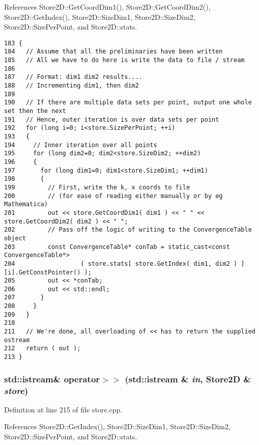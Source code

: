 References Store2D::GetCoordDim1(), Store2D::GetCoordDim2(), Store2D::GetIndex(), Store2D::SizeDim1, Store2D::SizeDim2, Store2D::SizePerPoint, and Store2D::stats.

\begin{Code}\begin{verbatim}183 {
184   // Assume that all the preliminaries have been written
185   // All we have to do here is write the data to file / stream
186 
187   // Format: dim1 dim2 results....
188   // Incrementing dim1, then dim2
189   
190   // If there are multiple data sets per point, output one whole set then the next
191   // Hence, outer iteration is over data sets per point
192   for (long i=0; i<store.SizePerPoint; ++i)
193   {
194     // Inner iteration over all points
195     for (long dim2=0; dim2<store.SizeDim2; ++dim2)
196     {
197       for (long dim1=0; dim1<store.SizeDim1; ++dim1)
198       {
199         // First, write the k, x coords to file
200         // (for ease of reading either manually or by eg Mathematica)
201         out << store.GetCoordDim1( dim1 ) << " " << store.GetCoordDim2( dim2 ) << " ";
202         // Pass off the logic of writing to the ConvergenceTable object
203         const ConvergenceTable* conTab = static_cast<const ConvergenceTable*>
204                  ( store.stats[ store.GetIndex( dim1, dim2 ) ][i].GetConstPointer() );
205         out << *conTab;
206         out << std::endl;
207       }
208     }
209   }
210 
211   // We're done, all overloading of << has to return the supplied ostream
212   return ( out );
213 }
\end{verbatim}
\end{Code}


\subsubsection{\setlength{\rightskip}{0pt plus 5cm}std::istream\& operator$>$$>$ (std::istream \& {\em in}, {\bf Store2D} \& {\em store})}\label{store_8cpp_bf866377a8793ea9bde62133d1c1f153}




Definition at line 215 of file store.cpp.

References Store2D::GetIndex(), Store2D::SizeDim1, Store2D::SizeDim2, Store2D::SizePerPoint, and Store2D::stats.

